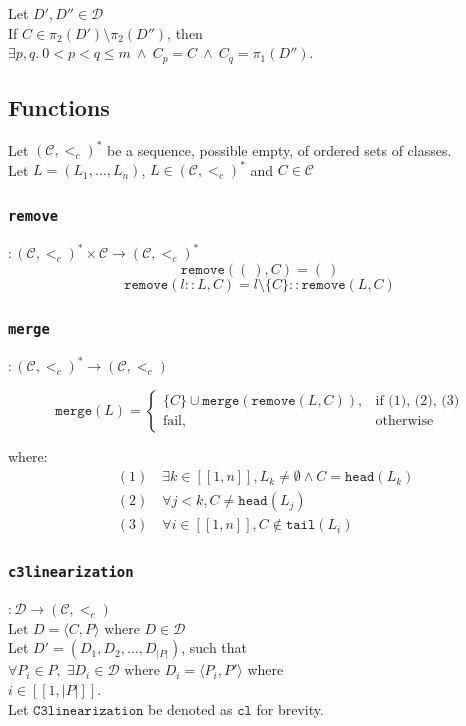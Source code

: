 \documentclass[runningheads]{llncs}
\newcommand*{\CC}{\ensuremath{\mathcal{C}}\xspace}
\newcommand*{\DD}{\ensuremath{\mathcal{D}}\xspace}
\newcommand*{\ordCC}{\ensuremath{(\mathcal{C}, <_c)}\xspace}
\newcommand*{\cl}{\texttt{c3linearization}}
\newcommand*{\rem}{\texttt{remove}}
\newcommand*{\h}{\texttt{head}}
\newcommand*{\mer}{\texttt{merge}}
\newcommand*{\oneToN}{\ensuremath{[\![1,n]\!]}\xspace}
\begin{document}
Let $D', D'' \in \DD$ \\
If $C \in \pi_2(D') \setminus \pi_2(D'')$, then\\ $\exists p,q. \ 0 < p < q \leq m \ \wedge \ C_p = C \ \wedge \ C_q = \pi_1(D'')$.

\subsection{Functions}
\label{sec:mergeFunctionMath}

Let $\ordCC^*$ be a sequence, possible empty, of ordered sets of classes.\\
Let $L = (L_1, \ldots , L_n)$, $L \in \ordCC^*$ and $C \in \mathcal{C}$\\

\subsubsection{\rem}$ : \ordCC^* \times \CC \to \ordCC^*$\\
\[
\rem(( \ ), C) = ( \ )
\]
\[
\rem(l::L, C) = l \setminus \{C\} :: \rem(L,C)
\]

\subsubsection{\mer}$ : \ordCC^* \to \ordCC $

\begin{equation*}
\mer(L)=
\begin{cases} 
\{C\} \cup \mer(\rem(L, C)), & \text{if (1), (2), (3)} \\
\text{fail}, & \text{otherwise}
\end{cases}
\end{equation*}

where:
\begin{align*}
&(1) \quad \exists k \in \oneToN, L_k \neq \emptyset \land C = \h(L_k) \\
&(2) \quad \forall j < k, C \neq \h(L_j) \\
&(3) \quad \forall i \in \oneToN, C \notin \texttt{tail}(L_i)
\end{align*}

\subsubsection{\cl}$: \DD \to \ordCC$\\
$\text{Let } D = \langle C, P \rangle \text{ where } D \in \DD$\\
Let $D' = (D_1,D_2, \dots ,D_{|P|})$, such that \\
$\forall P_i \in P, \; \exists D_i \in \DD \text{ where } D_i = \langle P_i, P' \rangle$ where\\ $i \in  [\![1, |P|]\!]$.\\
Let $\texttt{C3linearization}$ be denoted as $\texttt{cl}$ for brevity.
\end{document}
